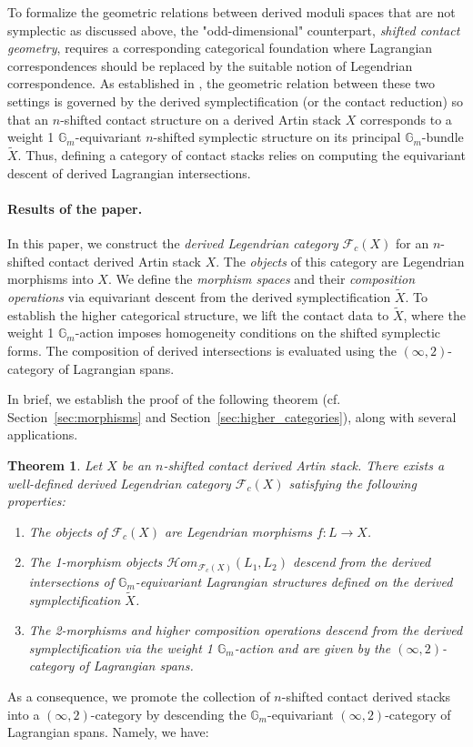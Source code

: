 \documentclass[reqno]{amsart}
\newcommand{\Gm}{\mathbb{G}_m}
\newtheorem{theorem}{Theorem}[section]
\begin{document}
To formalize the geometric relations between derived moduli spaces that are not symplectic as discussed above, the "odd-dimensional" counterpart, \textit{shifted contact geometry}, requires a corresponding categorical foundation where Lagrangian correspondences should be replaced by the suitable notion of Legendrian correspondence. As established in \cite{IzbudakBerktav}, the geometric relation between these two settings is governed by the derived symplectification (or the contact reduction) so that an $n$-shifted contact structure on a derived Artin stack $X$ corresponds to a weight 1 $\Gm$-equivariant $n$-shifted symplectic structure on its principal $\Gm$-bundle $\widetilde{X}$. Thus, defining a category of contact stacks relies on computing the equivariant descent of derived Lagrangian intersections.
\vspace{0.1in}

\paragraph{\bf Results of the paper.} In this paper, we construct the \textit{derived Legendrian category} $\mathcal{F}_{c}(X)$ for an $n$-shifted contact derived Artin stack $X$. The \textit{objects} of this category are Legendrian morphisms into $X$. We define the \textit{morphism spaces} and their \textit{composition operations} via equivariant descent from the derived symplectification $\widetilde{X}$. To establish the higher categorical structure, we lift the contact data to $\widetilde{X}$, where the weight 1 $\Gm$-action imposes homogeneity conditions on the shifted symplectic forms. The composition of derived intersections is evaluated using the $(\infty, 2)$-category of Lagrangian spans.

In brief, we establish the proof of the following theorem (cf. Section~\ref{sec:morphisms} and Section~\ref{sec:higher_categories}), along with several applications.

\begin{theorem} \label{thm:A}
Let $X$ be an $n$-shifted contact derived Artin stack. There exists a well-defined \emph{derived Legendrian category} $\mathcal{F}_{c}(X)$ satisfying the following properties:
\begin{enumerate}\itemsep=7pt
    \item The objects of $\mathcal{F}_{c}(X)$ are Legendrian morphisms $f \colon L \to X$.
    \item The 1-morphism objects $\mathcal{H}om_{\mathcal{F}_{c}(X)}(L_{1}, L_{2})$ descend from the derived intersections of $\Gm$-equivariant Lagrangian structures defined on the derived symplectification $\widetilde{X}$.
    \item The 2-morphisms and higher composition operations descend from the derived symplectification via the weight 1 $\Gm$-action and are given by the $(\infty, 2)$-category of Lagrangian spans.
\end{enumerate}
\end{theorem}
As a consequence, we promote the collection of $n$-shifted contact derived stacks into a $(\infty, 2)$-category by descending the $\Gm$-equivariant $(\infty, 2)$-category of Lagrangian spans. Namely, we have:
\end{document}
